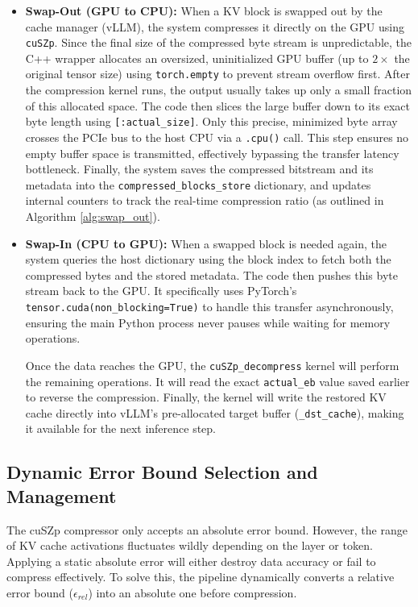\documentclass{polyu-comp}
\begin{document}
\begin{itemize}
    \item \textbf{Swap-Out (GPU to CPU):} When a KV block is swapped out by the cache manager (vLLM), the system compresses it directly on the GPU using \texttt{cuSZp}. Since the final size of the compressed byte stream is unpredictable, the C++ wrapper allocates an oversized, uninitialized GPU buffer (up to $2\times$ the original tensor size) using \texttt{torch.empty} to prevent stream overflow first. After the compression kernel runs, the output usually takes up only a small fraction of this allocated space. The code then slices the large buffer down to its exact byte length using \texttt{[:actual\_size]}. Only this precise, minimized byte array crosses the PCIe bus to the host CPU via a \texttt{.cpu()} call. This step ensures no empty buffer space is transmitted, effectively bypassing the transfer latency bottleneck. Finally, the system saves the compressed bitstream and its metadata into the \texttt{compressed\_blocks\_store} dictionary, and updates internal counters to track the real-time compression ratio (as outlined in Algorithm \ref{alg:swap_out}).
    
    \item \textbf{Swap-In (CPU to GPU):} When a swapped block is needed again, the system queries the host dictionary using the block index to fetch both the compressed bytes and the stored metadata. The code then pushes this byte stream back to the GPU. It specifically uses PyTorch's \texttt{tensor.cuda(non\_blocking=True)} to handle this transfer asynchronously, ensuring the main Python process never pauses while waiting for memory operations. 

Once the data reaches the GPU, the \texttt{cuSZp\_decompress} kernel will perform the remaining operations. It will read the exact \texttt{actual\_eb} value saved earlier to reverse the compression. Finally, the kernel will write the restored KV cache directly into vLLM's pre-allocated target buffer (\texttt{\_dst\_cache}), making it available for the next inference step.
\end{itemize}

\subsection{Dynamic Error Bound Selection and Management}
The cuSZp compressor only accepts an absolute error bound. However, the range of KV cache activations fluctuates wildly depending on the layer or token. Applying a static absolute error will either destroy data accuracy or fail to compress effectively. To solve this, the pipeline dynamically converts a relative error bound ($\epsilon_{rel}$) into an absolute one before compression.
\end{document}
